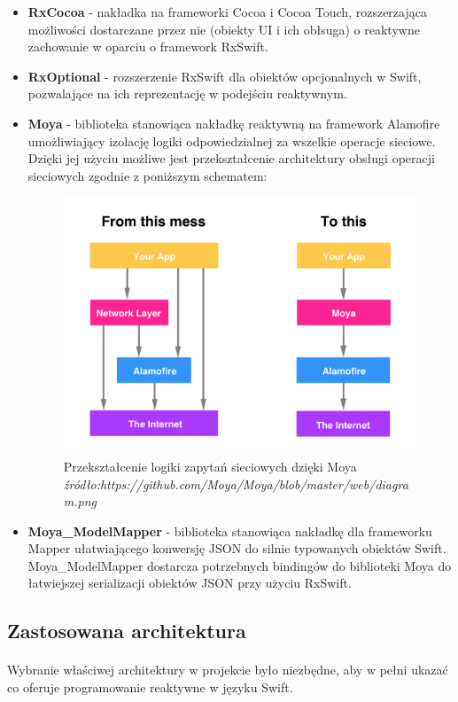 \documentclass[12pt,oneside,a4paper]{report}
\begin{document}
\begin{itemize}
	\item  \textbf{RxCocoa} - nakładka na frameworki Cocoa i Cocoa Touch, rozszerzająca możliwości dostarczane przez nie (obiekty UI i ich obłsuga) o reaktywne zachowanie w oparciu o framework RxSwift.  
	\item  \textbf{RxOptional} - rozszerzenie RxSwift dla obiektów opcjonalnych w Swift, pozwalające na ich reprezentację w podejściu reaktywnym.
	\item  \textbf{Moya} - biblioteka stanowiąca nakładkę reaktywną na framework Alamofire\cite{alamofire} umożliwiający izolację logiki odpowiedzialnej za wszelkie operacje sieciowe. Dzięki jej użyciu możliwe jest przekształcenie architektury obsługi operacji sieciowych zgodnie z poniższym schematem:
	\begin{figure}[ht!]
		\centering
		\includegraphics[width=13cm]{moyaDiagram}
		\caption{Przekształcenie logiki zapytań sieciowych dzięki Moya 
			\textit{źródło:https://github.com/Moya/Moya/blob/master/web/diagram.png}}
		\label{moyaDiagram}
	\end{figure}
	\newpage
	\item  \textbf{Moya\_ModelMapper} - biblioteka stanowiąca nakładkę dla frameworku Mapper\cite{mapper} ułatwiającego konwersję JSON do silnie typowanych obiektów Swift. Moya\_ModelMapper dostarcza potrzebnych bindingów do biblioteki Moya do łatwiejszej serializacji obiektów JSON przy użyciu RxSwift.
\end{itemize}
\subsection{Zastosowana architektura}
\paragraph{}Wybranie właściwej architektury w projekcie było niezbędne, aby w pełni ukazać co oferuje programowanie reaktywne w języku Swift. 
\end{document}
